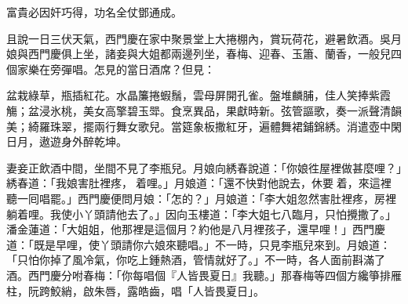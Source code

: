 富貴必因奸巧得，功名全仗鄧通成。

且說一日三伏天氣，西門慶在家中聚景堂上大捲棚內，賞玩荷花，避暑飲酒。吳月娘與西門慶俱上坐，諸妾與大姐都兩邊列坐，春梅、迎春、玉簫、蘭香，一般兒四個家樂在旁彈唱。怎見的當日酒席？但見：

盆栽綠草，瓶插紅花。水晶簾捲蝦鬚，雲母屏開孔雀。盤堆麟脯，佳人笑捧紫霞觴；盆浸氷桃，美女高擎碧玉斝。食烹異品，果獻時新。弦管謳歌，奏一派聲清韻美；綺羅珠翠，擺兩行舞女歌兒。當筵象板撒紅牙，遍體舞裙鋪錦綉。消遣壺中閑日月，遨遊身外醉乾坤。

妻妾正飲酒中間，坐間不見了李瓶兒。月娘向綉春說道：「你娘徃屋裡做甚麼哩？」綉春道：「我娘害肚裡疼，𢱉着哩。」月娘道：「還不快對他說去，休要𢱉着，來這裡聽一囘唱罷。」西門慶便問月娘：「怎的？」月娘道：「李大姐忽然害肚裡疼，房裡躺着哩。我使小丫頭請他去了。」因向玉樓道：「李大姐七八臨月，只怕攪撒了。」潘金蓮道：「大姐姐，他那裡是這個月？約他是八月裡孩子，還早哩！」西門慶道：「既是早哩，使丫頭請你六娘來聽唱。」不一時，只見李瓶兒來到。月娘道：「只怕你掉了風冷氣，你吃上鍾熱酒，管情就好了。」不一時，各人面前斟滿了酒。西門慶分咐春梅：「你每唱個『人皆畏夏日』我聽。」那春梅等四個方纔箏排雁柱，阮跨鮫綃，啟朱唇，露皓齒，唱「人皆畏夏日」。

